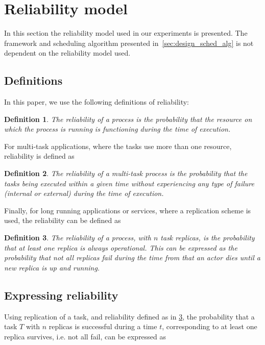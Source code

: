 \documentclass{cslthse-msc}
\newtheorem{definition}{Definition}[chapter]
\begin{document}
\section{Reliability model} \label{sec:design_reliability_model}
In this section the reliability model used in our experiments is presented. The framework and scheduling algorithm presented in~\cref{sec:design_sched_alg} is not dependent on the reliability model used.

\subsection{Definitions} \label{subsec:design_definitions}
In this paper, we use the following definitions of reliability:
\begin{definition} \label{def:single_task_reliability}
The reliability of a process is the probability that the resource on which the process is running is functioning during the time of execution.
\end{definition}

For multi-task applications, where the tasks use more than one resource, reliability is defined as
\begin{definition} \label{def:multi_task_reliability}
The reliability of a multi-task process is the probability that the tasks being executed within a given time without experiencing any type of failure (internal or external) during the time of execution.
\end{definition}

Finally, for long running applications or services, where a replication scheme is used, the reliability can be defined as \cite{effTaskReplMobGrid}
\begin{definition} \label{def:task_replica_reliability}
The reliability of a process, with $n$ task replicas, is the probability that at least one replica is always operational. This can be expressed as the probability that not all replicas fail during the time from that an actor dies until a new replica is up and running.
\end{definition}

\subsection{Expressing reliability}\label{subsec:design_reliability}
Using replication of a task, and reliability defined as in \cref{def:task_replica_reliability}, the probability that a task $T$ with $n$ replicas is successful during a time $t$, corresponding to at least one replica survives, i.e. not all fail, can be expressed as 
\end{document}
